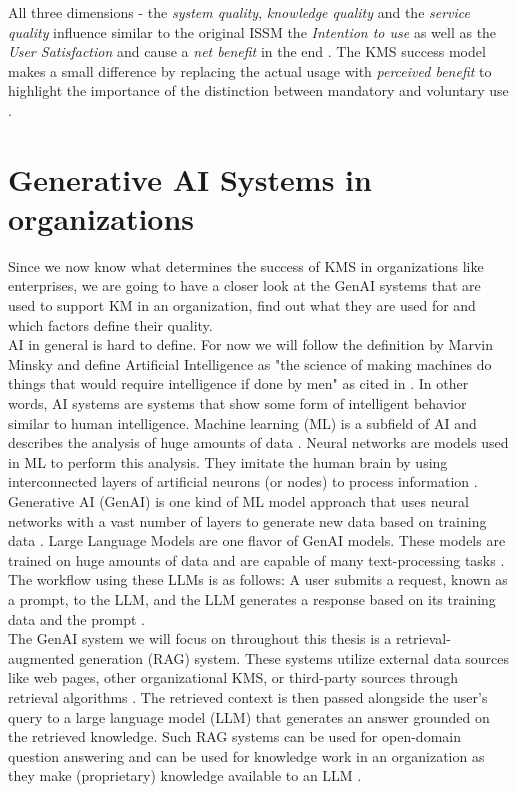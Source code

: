 \documentclass[
	english,
	ruledheaders=section,%
	class=report,%
	thesis={type=bachelor},%
	accentcolor=1b,%
	custommargins=true,%
	marginpar=false,%
	parskip=half-,%
	fontsize=11pt,%
	DIV=14,
]{tudapub}
\begin{document}
All three dimensions - the \textit{system quality}, \textit{knowledge quality} and the \textit{service quality} influence similar to the original ISSM the \textit{Intention to use} as well as the \textit{User Satisfaction} and cause a \textit{net benefit} in the end \parencite[p.~56]{Jennex2006}. The KMS success model makes a small difference by replacing the actual usage with \textit{perceived benefit} to highlight the importance of the distinction between mandatory and voluntary use \parencite[p.~55]{Jennex2006}.
\section{Generative AI Systems in organizations}
Since we now know what determines the success of KMS in organizations like enterprises, we are going to have a closer look at the GenAI systems that are used to support KM in an organization, find out what they are used for and which factors define their quality.\\
AI in general is hard to define. For now we will follow the definition by Marvin Minsky and define Artificial Intelligence as "the science of making machines do things that would require intelligence if done by men" \parencite{Minsky1966} as cited in \parencite{Dennis2025}. In other words, AI systems are systems that show some form of intelligent behavior similar to human intelligence. Machine learning (ML) is a subfield of AI and describes the analysis of huge amounts of data \parencite[p.~573]{Lund2023}. Neural networks are models used in ML to perform this analysis. They imitate the human brain by using interconnected layers of artificial neurons (or nodes) to process information \parencite[p.~573]{Lund2023}. Generative AI (GenAI) is one kind of ML model approach that uses neural networks with a vast number of layers to generate new data based on training data \parencite[p.~574]{Lund2023}.
Large Language Models are one flavor of GenAI models. These models are trained on huge amounts of data and are capable of many text-processing tasks \parencite[p.~2]{Naveed2024}. The workflow using these LLMs is as follows: A user submits a request, known as a prompt, to the LLM, and the LLM generates a response based on its training data and the prompt \parencite[p.~575]{Lund2023}.\\
The GenAI system we will focus on throughout this thesis is a retrieval-augmented generation (RAG) system. These systems utilize external data sources like web pages, other organizational KMS, or third-party sources through retrieval algorithms \parencite{AWS_RAG}. The retrieved context is then passed alongside the user's query to a large language model (LLM) that generates an answer grounded on the retrieved knowledge. Such RAG systems can be used for open-domain question answering and can be used for knowledge work in an organization as they make (proprietary) knowledge available to an LLM \parencite[p.~9459]{Lewis2020}.\\
\end{document}
